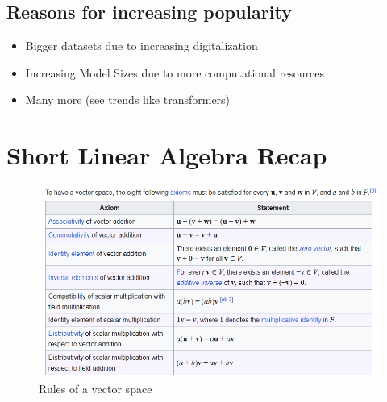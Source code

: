 \documentclass[../Main.tex]{subfiles}
\begin{document}
\subsection{Reasons for increasing popularity}
\begin{itemize}
    \item Bigger datasets due to increasing digitalization
    \item Increasing Model Sizes due to more computational resources
    \item Many more (see trends like transformers)
\end{itemize}

\newpage
\section{Short Linear Algebra Recap}

\begin{figure}[H]
    \centering
    \includegraphics[width=0.75\linewidth]{Images/vector-space.png}
    \caption{Rules of a vector space}
\end{figure}
\end{document}
